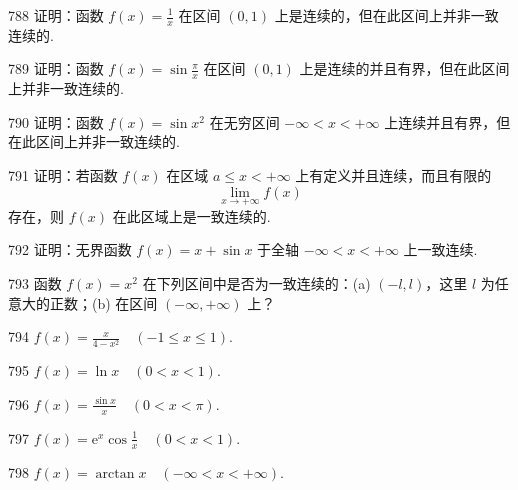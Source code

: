 \begin{prob}[M]{788}
证明：函数 $f(x) = \frac{1}{x}$ 在区间 $(0, 1)$ 上是连续的，但在此区间上并非一致连续的.
\end{prob}

\begin{prob}[M]{789}
证明：函数 $f(x) = \sin \frac{\pi}{x}$ 在区间 $(0, 1)$ 上是连续的并且有界，但在此区间上并非一致连续的.
\end{prob}

\begin{prob}[M]{790}
证明：函数 $f(x) = \sin x^2$ 在无穷区间 $-\infty < x < +\infty$ 上连续并且有界，但在此区间上并非一致连续的.
\end{prob}

\begin{prob}[M]{791}
证明：若函数 $f(x)$ 在区域 $a \leqslant x < +\infty$ 上有定义并且连续，而且有限的
\[
\lim_{x \to +\infty} f(x)
\]
存在，则 $f(x)$ 在此区域上是一致连续的.
\end{prob}

\begin{prob}[M]{792}
证明：无界函数 $f(x) = x + \sin x$ 于全轴 $-\infty < x < +\infty$ 上一致连续.
\end{prob}

\begin{prob}[M]{793}
函数 $f(x) = x^2$ 在下列区间中是否为一致连续的：(a) $(-l, l)$，这里 $l$ 为任意大的正数；\qquad (b) 在区间 $(-\infty, +\infty)$ 上？
\end{prob}


\begin{prob}[S]{794}
$f(x) = \frac{x}{4 - x^2} \quad (-1 \leqslant x \leqslant 1).$
\end{prob}

\begin{prob}[S]{795}
$f(x) = \ln x \quad (0 < x < 1).$
\end{prob}

\begin{prob}[S]{796}
$f(x) = \frac{\sin x}{x} \quad (0 < x < \pi).$
\end{prob}

\begin{prob}[S]{797}
$f(x) = \mathrm{e}^x \cos \frac{1}{x} \quad (0 < x < 1).$
\end{prob}

\begin{prob}[S]{798}
$f(x) = \arctan x \quad (-\infty < x < +\infty).$
\end{prob}

